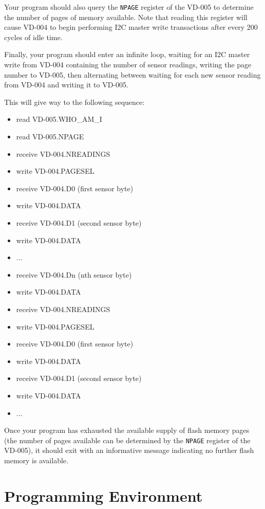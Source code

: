 \documentclass{article}
\begin{document}
Your program should also query the \texttt{NPAGE} register of the VD-005 to
determine the number of pages of memory available.  Note that reading this
register will cause VD-004 to begin performing I2C master write transactions
after every 200 cycles of idle time.

Finally, your program should enter an infinite loop, waiting for an I2C master
write from VD-004 containing the number of sensor readings, writing the page
number to VD-005, then alternating between waiting for each new sensor reading
from VD-004 and writing it to VD-005.

This will give way to the following sequence:
\begin{itemize}
	
	\item read VD-005.WHO\_AM\_I
	\item read VD-005.NPAGE
	\item receive VD-004.NREADINGS
	\item write VD-004.PAGESEL
	\item receive VD-004.D0 (first sensor byte)
	\item write VD-004.DATA	
	\item receive VD-004.D1 (second sensor byte)
	\item write VD-004.DATA	
	\item ...
	\item receive VD-004.Dn (nth sensor byte)
	\item write VD-004.DATA
	\item receive VD-004.NREADINGS
	\item write VD-004.PAGESEL
	\item receive VD-004.D0 (first sensor byte)
	\item write VD-004.DATA	
	\item receive VD-004.D1 (second sensor byte)
	\item write VD-004.DATA
	\item ...
	
\end{itemize}

Once your program has exhausted the available supply of flash memory pages (the
number of pages available can be determined by the \texttt{NPAGE} register of
the VD-005), it should exit with an informative message indicating no further
flash memory is available.

\section{Programming Environment}
\end{document}
